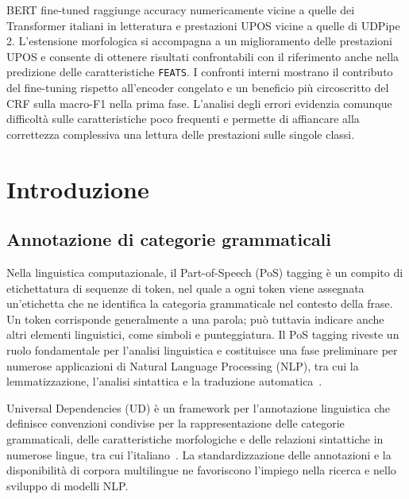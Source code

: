 \documentclass[12pt,a4paper]{report}
\begin{document}
BERT fine-tuned raggiunge accuracy numericamente vicine a quelle dei Transformer italiani in letteratura e prestazioni UPOS vicine a quelle di UDPipe 2. L'estensione morfologica si accompagna a un miglioramento delle prestazioni UPOS e consente di ottenere risultati confrontabili con il riferimento anche nella predizione delle caratteristiche \texttt{FEATS}. I confronti interni mostrano il contributo del fine-tuning rispetto all'encoder congelato e un beneficio più circoscritto del CRF sulla macro-F1 nella prima fase. L'analisi degli errori evidenzia comunque difficoltà sulle caratteristiche poco frequenti e permette di affiancare alla correttezza complessiva una lettura delle prestazioni sulle singole classi.

\newpage

\begingroup
\small
\setlength{\parskip}{0pt}
\tableofcontents
\endgroup

\newpage
{}

\chapter{Introduzione}
\label{chap:introduction}
\section{Annotazione di categorie grammaticali}
\label{sec:grammatical-categories}

Nella linguistica computazionale, il Part-of-Speech (PoS) tagging è un compito di etichettatura di sequenze di token, nel quale a ogni token viene assegnata un'etichetta che ne identifica la categoria grammaticale nel contesto della frase. Un token corrisponde generalmente a una parola; può tuttavia indicare anche altri elementi linguistici, come simboli e punteggiatura. Il PoS tagging riveste un ruolo fondamentale per l'analisi linguistica e costituisce una fase preliminare per numerose applicazioni di Natural Language Processing (NLP), tra cui la lemmatizzazione, l'analisi sintattica e la traduzione automatica~\cite{manning2011}.

Universal Dependencies (UD) è un framework per l'annotazione linguistica che definisce convenzioni condivise per la rappresentazione delle categorie grammaticali, delle caratteristiche morfologiche e delle relazioni sintattiche in numerose lingue, tra cui l'italiano~\cite{ud}. La standardizzazione delle annotazioni e la disponibilità di corpora multilingue ne favoriscono l'impiego nella ricerca e nello sviluppo di modelli NLP.
\end{document}
